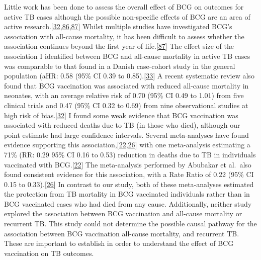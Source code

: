 \documentclass[11pt,twoside]{bristolthesis}
\begin{document}
  Little work has been done to assess the overall effect of BCG on outcomes for active TB cases although the possible non-specific effects of BCG are an area of active research.{[}\protect\hyperlink{ref-Higgins}{32},\protect\hyperlink{ref-Kandasamy2016}{86},\protect\hyperlink{ref-Pollard2017}{87}{]} Whilst multiple studies have investigated BCG's association with all-cause mortality, it has been difficult to assess whether the association continues beyond the first year of life.{[}\protect\hyperlink{ref-Pollard2017}{87}{]} The effect size of the association I identified between BCG and all-cause mortality in active TB cases was comparable to that found in a Danish case-cohort study in the general population (aHR: 0.58 (95\% CI 0.39 to 0.85).{[}\protect\hyperlink{ref-Rieckmann2016}{33}{]} A recent systematic review also found that BCG vaccination was associated with reduced all-cause mortality in neonates, with an average relative risk of 0.70 (95\% CI 0.49 to 1.01) from five clinical trials and 0.47 (95\% CI 0.32 to 0.69) from nine observational studies at high risk of bias.{[}\protect\hyperlink{ref-Higgins}{32}{]} I found some weak evidence that BCG vaccination was associated with reduced deaths due to TB (in those who died), although our point estimate had large confidence intervals. Several meta-analyses have found evidence supporting this association,{[}\protect\hyperlink{ref-Colditz1994}{22},\protect\hyperlink{ref-Abubakar2013}{26}{]} with one meta-analysis estimating a 71\% (RR: 0.29 95\% CI 0.16 to 0.53) reduction in deaths due to TB in individuals vaccinated with BCG.{[}\protect\hyperlink{ref-Colditz1994}{22}{]} The meta-analysis performed by Abubakar et al.~also found consistent evidence for this association, with a Rate Ratio of 0.22 (95\% CI 0.15 to 0.33).{[}\protect\hyperlink{ref-Abubakar2013}{26}{]} In contrast to our study, both of these meta-analyses estimated the protection from TB mortality in BCG vaccinated individuals rather than in BCG vaccinated cases who had died from any cause. Additionally, neither study explored the association between BCG vaccination and all-cause mortality or recurrent TB. This study could not determine the possible causal pathway for the association between BCG vaccination all-cause mortality, and recurrent TB. These are important to establish in order to understand the effect of BCG vaccination on TB outcomes.
  
\end{document}
